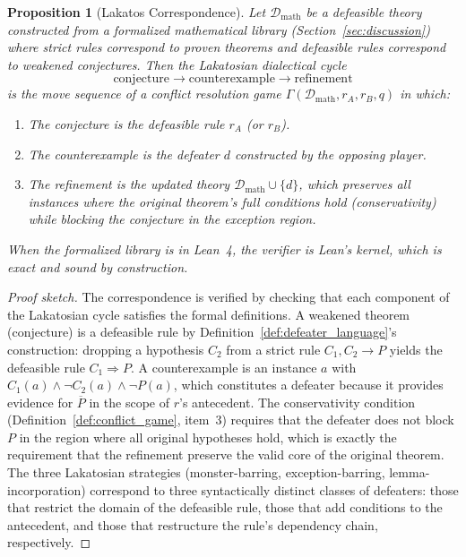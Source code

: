 \documentclass{article}
\newtheorem{proposition}[theorem]{Proposition}
\theoremstyle{definition}
\newcommand{\D}{\mathcal{D}}
\newcommand{\defto}{\Rightarrow}
\newcommand{\strictto}{\rightarrow}
\newcommand{\comp}[1]{\overline{#1}}
\begin{document}
\begin{proposition}[Lakatos Correspondence]\label{prop:lakatos_correspondence}
Let $\D_{\mathrm{math}}$ be a defeasible theory constructed from a formalized mathematical library (Section~\ref{sec:discussion}) where strict rules correspond to proven theorems and defeasible rules correspond to weakened conjectures. Then the Lakatosian dialectical cycle
\[
    \text{conjecture} \longrightarrow \text{counterexample} \longrightarrow \text{refinement}
\]
is the move sequence of a conflict resolution game $\Gamma(\D_{\mathrm{math}}, r_A, r_B, q)$ in which:
\begin{enumerate}[nosep]
    \item The conjecture is the defeasible rule $r_A$ (or $r_B$).
    \item The counterexample is the defeater $d$ constructed by the opposing player.
    \item The refinement is the updated theory $\D_{\mathrm{math}} \cup \{d\}$, which preserves all instances where the original theorem's full conditions hold (conservativity) while blocking the conjecture in the exception region.
\end{enumerate}
When the formalized library is in Lean~4, the verifier is Lean's kernel, which is exact and sound by construction.
\end{proposition}

\begin{proof}[Proof sketch]
The correspondence is verified by checking that each component of the Lakatosian cycle satisfies the formal definitions. A weakened theorem (conjecture) is a defeasible rule by Definition~\ref{def:defeater_language}'s construction: dropping a hypothesis $C_2$ from a strict rule $C_1, C_2 \strictto P$ yields the defeasible rule $C_1 \defto P$. A counterexample is an instance $a$ with $C_1(a) \wedge \neg C_2(a) \wedge \neg P(a)$, which constitutes a defeater because it provides evidence for $\comp{P}$ in the scope of $r$'s antecedent. The conservativity condition (Definition~\ref{def:conflict_game}, item~3) requires that the defeater does not block $P$ in the region where all original hypotheses hold, which is exactly the requirement that the refinement preserve the valid core of the original theorem. The three Lakatosian strategies (monster-barring, exception-barring, lemma-incorporation) correspond to three syntactically distinct classes of defeaters: those that restrict the domain of the defeasible rule, those that add conditions to the antecedent, and those that restructure the rule's dependency chain, respectively.
\end{proof}
\end{document}
